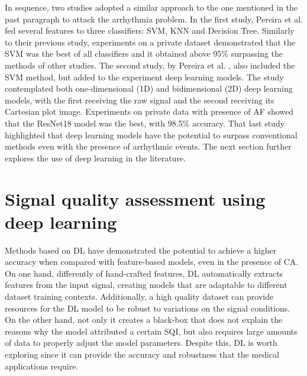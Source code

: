In sequence, two studies adopted a similar approach to the one mentioned in the past paragraph to attack the arrhythmia problem. In the first study, Pereira et al. \cite{arrhythmia-3} fed several features to three classifiers: \gls{SVM}, \gls{KNN} and Decision Tree. Similarly to their previous study, experiments on a private dataset demonstrated that the \gls{SVM} was the best of all classifiers and it obtained above 95\% surpassing the methods of other studies. The second study, by Pereira et al. \cite{arrhythmia-4}, also included the \gls{SVM} method, but added to the experiment deep learning models. The study contemplated both one-dimensional (1D) and bidimensional (2D) deep learning models, with the first receiving the raw signal and the second receiving its Cartesian plot image. Experiments on private data with presence of \gls{AF} showed that the ResNet18 model was the best, with 98.5\% accuracy. That last study highlighted that deep learning models have the potential to surpass conventional methods even with the presence of arrhythmic events. The next section further explores the use of deep learning in the literature.  

\section{Signal quality assessment using deep learning}
\label{sec:deep_learning}

Methods based on \gls{DL} have demonstrated the potential to achieve a higher accuracy when compared with feature-based models, even in the presence of \gls{CA}. On one hand, differently of hand-crafted features, \gls{DL} automatically extracts features from the input signal, creating models that are adaptable to different dataset training contexts. Additionally, a high quality dataset can provide resources for the \gls{DL} model to be robust to variations on the signal conditions. On the other hand, not only it creates a black-box that does not explain the reasons why the model attributed a certain \gls{SQI}, but also requires large amounts of data to properly adjust the model parameters. Despite this, \gls{DL} is worth exploring since it can provide the accuracy and robustness that the medical applications require. 

